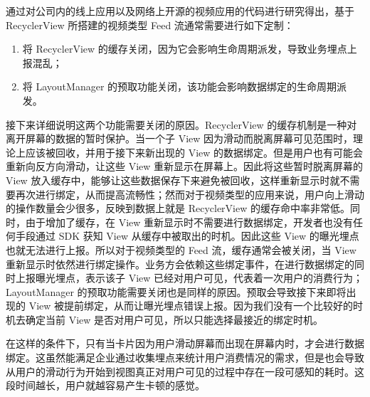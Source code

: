 
通过对公司内的线上应用以及网络上开源的视频应用的代码进行研究得出，基于 RecyclerView 所搭建的视频类型 Feed 流通常需要进行如下定制：

\begin{enumerate}
    \item 将 RecyclerView 的缓存关闭，因为它会影响生命周期派发，导致业务埋点上报混乱；
    \item 将 LayoutManager 的预取功能关闭，该功能会影响数据绑定的生命周期派发。
\end{enumerate}

接下来详细说明这两个功能需要关闭的原因。RecyclerView 的缓存机制是一种对离开屏幕的数据的暂时保护。当一个子 View 因为滑动而脱离屏幕可见范围时，理论上应该被回收，并用于接下来新出现的 View 的数据绑定。但是用户也有可能会重新向反方向滑动，让这些 View 重新显示在屏幕上。因此将这些暂时脱离屏幕的 View 放入缓存中，能够让这些数据保存下来避免被回收，这样重新显示时就不需要再次进行绑定，从而提高流畅性；然而对于视频类型的应用来说，用户向上滑动的操作数量会少很多，反映到数据上就是 RecyclerView 的缓存命中率非常低。同时，由于增加了缓存，在 View 重新显示时不需要进行数据绑定，开发者也没有任何手段通过 SDK 获知 View 从缓存中被取出的时机。因此这些 View 的曝光埋点也就无法进行上报。所以对于视频类型的 Feed 流，缓存通常会被关闭，当 View 重新显示时依然进行绑定操作。业务方会依赖这些绑定事件，在进行数据绑定的同时上报曝光埋点，表示该子 View 已经对用户可见，代表着一次用户的消费行为；LayoutManager 的预取功能需要关闭也是同样的原因。预取会导致接下来即将出现的 View 被提前绑定，从而让曝光埋点错误上报。因为我们没有一个比较好的时机去确定当前 View 是否对用户可见，所以只能选择最接近的绑定时机。

在这样的条件下，只有当卡片因为用户滑动屏幕而出现在屏幕内时，才会进行数据绑定。这虽然能满足企业通过收集埋点来统计用户消费情况的需求，但是也会导致从用户的滑动行为开始到视图真正对用户可见的过程中存在一段可感知的耗时。这段时间越长，用户就越容易产生卡顿的感觉。